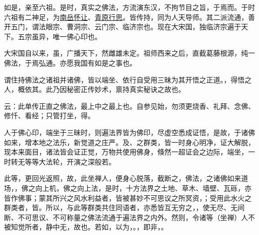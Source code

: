 如是，亲至六祖。是时，真实之佛法，方流演东汉，不拘节目之旨，于焉而。于时六祖有二神足，为\uline{南岳怀让}、\uline{青原行思}。皆传持，同为人天导师。其二派流通，善开五门，谓法眼宗、曹洞宗、云门宗、临济宗也。现在大宋国，独临济宗遍于天下。五宗虽异，唯一佛心印也。

大宋国自以来，虽，广播天下，然雌雄未定。祖师西来之后，直截葛藤根源，纯一佛法，于焉弘通。亦愿我国有如是之事也。

谓住持佛法之诸祖并诸佛，皆以端坐、依行自受用三昧为其开悟之正道。，得悟之人，概依其。此乃因秘密正传妙术，禀持真实秘诀之故也。

云：此单传正直之佛法，最上中之最上也。自参见始，勿须更烧香、礼拜、念佛、修忏、看经；只管打坐，得。

人于佛心印，端坐于三昧时，则遍法界皆为佛印，尽虚空悉成证悟，是故，于诸佛如来，增本地之法乐，新觉道之庄严。及、之群类，皆一时身心明净，证大解脱，现本来面目，诸法皆会证正觉，万物共使用佛身，倏然一超证会之边际，端坐，一时转无等等大法轮，开演之深般若。

此等，更回光返照，故，此坐禅人，便身心脱落，截断之，佛法，之诸佛如来道场，，佛之向上机，佛之向上法，是时，十方法界之土地、草木、墙壁、瓦砾，亦皆作佛事；蒙其所兴之风水利益者，皆被甚妙不可思议之所冥资，；受用此水火之群类者，皆。所以，与此等群类共住同语者，亦悉皆互无穷之，，使无尽、无间断、不可思议、不可称量之佛法流通于遍法界之内外。然则，令诸等（坐禅）人不被知觉所者，静中无，故也。若如，以为，。，即非，。

